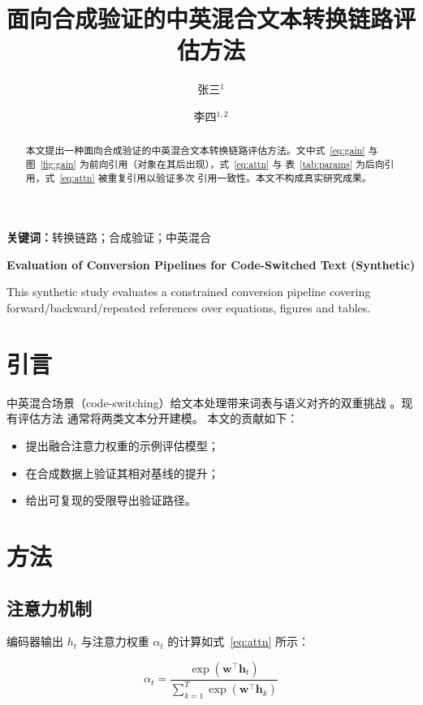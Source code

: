 \documentclass[10pt,twocolumn]{article}
\title{面向合成验证的中英混合文本转换链路评估方法}
\author{张三$^{1}$ \and 李四$^{1,2}$}
\affil{$^{1}$示例大学计算机学院，北京 100000 \and $^{2}$示例研究院人工智能实验室，上海 200000}
\begin{document}
\maketitle

\begin{abstract}
本文提出一种面向合成验证的中英混合文本转换链路评估方法。文中式~\eqref{eq:gain}
与图~\ref{fig:gain} 为前向引用（对象在其后出现），式~\eqref{eq:attn} 与
表~\ref{tab:params} 为后向引用，式~\eqref{eq:attn} 被重复引用以验证多次
引用一致性。本文不构成真实研究成果。
\end{abstract}

\noindent\textbf{关键词：}转换链路；合成验证；中英混合

\noindent\textbf{Evaluation of Conversion Pipelines for Code-Switched Text (Synthetic)}
\vspace{0.5em}

\noindent This synthetic study evaluates a constrained conversion pipeline
covering forward/backward/repeated references over equations, figures and tables.

\section{引言}\label{sec:intro}

中英混合场景（code-switching）给文本处理带来词表与语义对齐的双重挑战
\cite{zhang2025}。现有评估方法 \cite{smith2024} 通常将两类文本分开建模。
本文的贡献如下：

\begin{itemize}
  \item 提出融合注意力权重的示例评估模型；
  \item 在合成数据上验证其相对基线的提升；
  \item 给出可复现的受限导出验证路径。
\end{itemize}

\section{方法}\label{sec:method}

\subsection{注意力机制}

编码器输出 $h_{t}$ 与注意力权重 $\alpha_{t}$ 的计算如式~\eqref{eq:attn}
所示：

\begin{equation}
  \alpha_{t} = \frac{\exp(\boldsymbol{w}^{\top}\boldsymbol{h}_{t})}
                   {\sum_{k=1}^{T}\exp(\boldsymbol{w}^{\top}\boldsymbol{h}_{k})}
  \label{eq:attn}
\end{equation}
\end{document}
